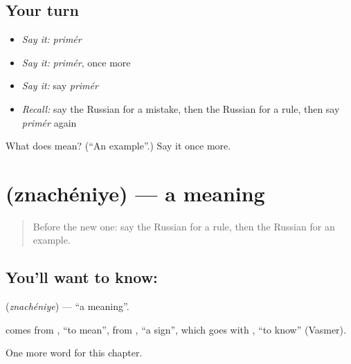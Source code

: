 \subsection*{Your turn}
\begin{itemize}
\raggedright
  \item \emph{Say it:} \emph{primér}
  \item \emph{Say it:} \emph{primér}, once more
  \item \emph{Say it:} say \emph{primér}
  \item \emph{Recall:} say the Russian for a mistake, then the Russian for a rule, then say \emph{primér} again
\end{itemize}

\begin{tcolorbox}[breakable,colback=teal!4,colframe=teal!35!black,title={Before you move on}]
What does  mean? (\textquotedblleft{}An example\textquotedblright{}.) Say it once more.
\end{tcolorbox}
\section[\texorpdfstring{\ru{значение} (znachéniye)}{значение (znachéniye)}]{ (znachéniye) — a meaning}

\label{lesson:RU-C228-znacheniye}



\begin{quote}
Before the new one: say the Russian for a rule, then the Russian for an example.
\end{quote}

\subsection*{You'll want to know: }
\textbf{} (\emph{znachéniye}) — \textquotedblleft{}a meaning\textquotedblright{}.

\begin{cousinweb}
\textbf{} comes from \emph{}, \textquotedblleft{}to mean\textquotedblright{}, from \emph{}, \textquotedblleft{}a sign\textquotedblright{}, which goes with \emph{}, \textquotedblleft{}to know\textquotedblright{} (Vasmer).
\end{cousinweb}

\begin{grammarlens}[title={What you've built}]
One more word for this chapter.
\end{grammarlens}

